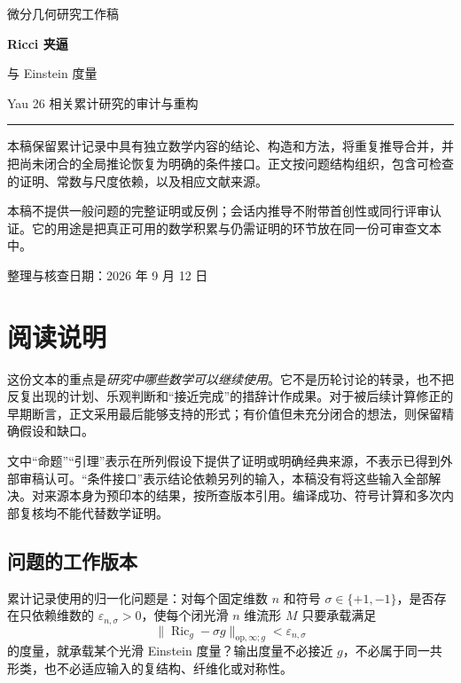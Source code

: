 \documentclass[UTF8,fontset=fandol,zihao=-4,oneside,openany]{ctexbook}
\theoremstyle{cjkplain}
\numberwithin{equation}{chapter}
\DeclareMathOperator{\Ric}{Ric}
\begin{document}
\frontmatter


\begin{titlepage}
\centering
\vspace*{22mm}
{\sffamily\large 微分几何研究工作稿\par}
\vspace{12mm}
{\sffamily\bfseries\fontsize{30}{40}\selectfont Ricci 夹逼\par 与 Einstein 度量\par}
\vspace{9mm}
{\Large Yau 26 相关累计研究的审计与重构\par}
\vspace{12mm}
{\color{ink}\rule{0.72\textwidth}{0.7pt}\par}
\vspace{10mm}
\begin{minipage}{0.77\textwidth}
\normalsize
本稿保留累计记录中具有独立数学内容的结论、构造和方法，将重复推导合并，并把尚未闭合的全局推论恢复为明确的条件接口。正文按问题结构组织，包含可检查的证明、常数与尺度依赖，以及相应文献来源。

\medskip
本稿不提供一般问题的完整证明或反例；会话内推导不附带首创性或同行评审认证。它的用途是把真正可用的数学积累与仍需证明的环节放在同一份可审查文本中。
\end{minipage}
\vfill
{\large 整理与核查日期：2026 年 9 月 12 日\par}
\vspace{10mm}
\end{titlepage}

\chapter*{阅读说明}
这份文本的重点是\emph{研究中哪些数学可以继续使用}。它不是历轮讨论的转录，也不把反复出现的计划、乐观判断和“接近完成”的措辞计作成果。对于被后续计算修正的早期断言，正文采用最后能够支持的形式；有价值但未充分闭合的想法，则保留精确假设和缺口。

文中“命题”“引理”表示在所列假设下提供了证明或明确经典来源，不表示已得到外部审稿认可。“条件接口”表示结论依赖另列的输入，本稿没有将这些输入全部解决。对来源本身为预印本的结果，按所查版本引用。编译成功、符号计算和多次内部复核均不能代替数学证明。

\section*{问题的工作版本}
累计记录使用的归一化问题是：对每个固定维数 $n$ 和符号 $\sigma\in\{+1,-1\}$，是否存在只依赖维数的 $\varepsilon_{n,\sigma}>0$，使每个闭光滑 $n$ 维流形 $M$ 只要承载满足
\[
\|\Ric_g-\sigma g\|_{\mathrm{op},\infty;g}<\varepsilon_{n,\sigma}
\]
的度量，就承载某个光滑 Einstein 度量？输出度量不必接近 $g$，不必属于同一共形类，也不必适应输入的复结构、纤维化或对称性。
\end{document}
